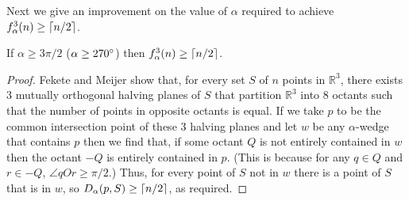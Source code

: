 \documentclass[lotsofwhite]{patmorin}
\begin{document}
Next we give an improvement on the value of $\alpha$ required to
achieve $f_\alpha^3(n)\ge\left\lceil n/2 \right\rceil$.

\begin{lem} 
If $\alpha\ge 3\pi/2$ ($\alpha\ge 270^\circ$) then $f_\alpha^3(n)\ge
\left\lceil n/2 \right\rceil$.
\end{lem}

\begin{proof}
Fekete and Meijer \cite{fm00} show that, for every set $S$ of $n$
points in $\mathbb{R}^3$, there exists 3 mutually orthogonal
halving planes of $S$ that partition $\mathbb{R}^3$ into 8 octants such that the
number of points in opposite octants is equal.  If we take $p$ to be
the common intersection point of these 3 halving planes and let $w$ be
any $\alpha$-wedge that contains $p$ then we find that, if some octant
$Q$ is not entirely contained in $w$ then the octant $-Q$ is entirely
contained in $p$.  (This is because for any $q\in Q$ and $r\in-Q$,
$\angle qOr\ge \pi/2$.) Thus, for every point of $S$ not in $w$ there
is a point of $S$ that is in $w$, so $D_\alpha(p,S)\ge \left\lceil n/2 \right\rceil$, as
required. 
\end{proof}
\end{document}
